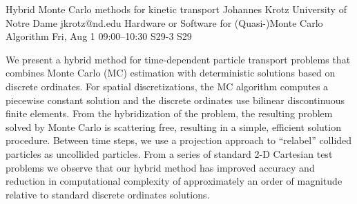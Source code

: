 \begin{talk}
  {Hybrid Monte Carlo methods for kinetic transport}%
  {Johannes Krotz}%
  {University of Notre Dame}%
  {jkrotz@nd.edu}%
  {Hardware or Software for (Quasi-)Monte Carlo Algorithm}%
  {}%
  {Fri, Aug 1 09:00–10:30}%
  {S29-3}%
  {S29}%
				
			

We present a hybrid method for time-dependent particle transport problems that combines Monte Carlo (MC) estimation with deterministic solutions based on discrete ordinates. For spatial discretizations, the MC algorithm computes a piecewise constant solution and the discrete ordinates use bilinear discontinuous finite elements. From the hybridization of the problem, the resulting problem solved by Monte Carlo is scattering free, resulting in a simple, efficient solution procedure. Between time steps, we use a projection approach to “relabel” collided particles as uncollided particles. From a series of standard 2-D Cartesian test problems we observe that our hybrid method has improved accuracy and reduction in computational complexity of approximately an order of magnitude relative to standard discrete ordinates solutions.

\end{talk}
